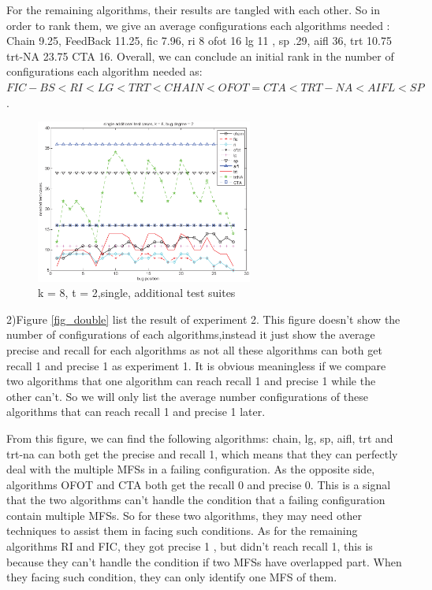 \documentclass[10pt,journal,cspaper,compsoc]{IEEEtran}
\begin{document}
For the remaining algorithms, their results are tangled with each other. So in order to rank them, we give an average configurations each algorithms needed : Chain 9.25, FeedBack 11.25, fic 7.96, ri 8 ofot 16 lg 11 , sp .29, aifl 36, trt 10.75 trt-NA 23.75   CTA 16. Overall, we can conclude an initial rank in the number of configurations each algorithm needed as:  $FIC-BS<RI<LG<TRT<CHAIN<OFOT = CTA <TRT-NA<AIFL<SP$.

\begin{figure}
 \centering
 \includegraphics[width=2.8in]{single.eps}
 \caption{k = 8, t = 2,single, additional test suites}
 \label{fig_single}
\end{figure}

2)Figure \ref{fig_double} list the result of experiment 2. This figure doesn't show the number of configurations of each algorithms,instead it just show the average precise and recall for each algorithms as not all these algorithms can both get recall 1 and precise 1 as experiment 1. It is obvious meaningless if we compare two algorithms that one algorithm can reach recall 1 and precise 1 while the other can't. So we will only list the average number configurations of these algorithms that can reach recall 1 and precise 1 later.

From this figure, we can find the following algorithms: chain, lg, sp, aifl, trt and trt-na can both get the precise and recall 1, which means that they can perfectly deal with the multiple MFSs in a failing configuration. As the opposite side, algorithms OFOT and CTA both get the recall 0 and precise 0. This is a signal that the two algorithms can't handle the condition that a failing configuration contain multiple MFSs. So for these two algorithms, they may need other techniques to assist them in facing such conditions.  As for the remaining algorithms RI and FIC, they got precise 1 , but didn't reach recall 1, this is because they can't handle the condition if two MFSs have overlapped part. When they facing such condition, they can only identify one MFS of them.
\end{document}
